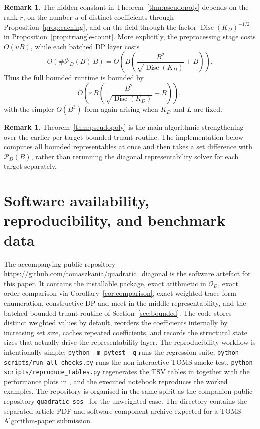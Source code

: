 \documentclass[manuscript]{acmart}
\theoremstyle{plain}
\theoremstyle{definition}
\theoremstyle{nonitalicremark}
\newtheorem{remark}[theorem]{Remark}
\newcommand{\OO}{\mathcal{O}}
\newcommand{\OD}{\OO_D}
\newcommand{\Disc}{\operatorname{Disc}}
\newcommand{\cP}{\mathcal{P}}
\begin{document}
\begin{remark}
The hidden constant in Theorem~\ref{thm:pseudopoly} depends on the rank $r$, on the number $u$ of
distinct coefficients through Proposition~\ref{prop:caching}, and on the field through the factor
$\Disc(K_D)^{-1/2}$ in Proposition~\ref{prop:triangle-count}. More explicitly, the preprocessing
stage costs $O(uB)$, while each batched DP layer costs
\[
O\!\left(\#\cP_D(B)\,B\right)
=
O\!\left(B\left(\frac{B^2}{\sqrt{\Disc(K_D)}}+B\right)\right).
\]
Thus the full bounded runtime is bounded by
\[
O\!\left(r\,B\left(\frac{B^2}{\sqrt{\Disc(K_D)}}+B\right)\right),
\]
with the simpler $O(B^3)$ form again arising when $K_D$ and $L$ are fixed.
\end{remark}

\begin{remark}
Theorem~\ref{thm:pseudopoly} is the main algorithmic strengthening over the earlier per-target
bounded-truant routine. The implementation below computes all bounded representables at once and then
takes a set difference with $\cP_D(B)$, rather than rerunning the diagonal representability solver
for each target separately.
\end{remark}

\section{Software availability, reproducibility, and benchmark data}\label{sec:impl}

The accompanying public repository \url{https://github.com/tomaszkania/quadratic_diagonal} is the
software artefact for this paper. It contains the installable package, exact arithmetic in $\OD$,
exact order comparison via Corollary~\ref{cor:comparison}, exact weighted trace-form enumeration,
constructive DP and meet-in-the-middle representability, and the batched bounded-truant routine of
Section~\ref{sec:bounded}. The code stores distinct weighted values by default, reorders the
coefficients internally by increasing set size, caches repeated coefficients, and records the
structural state sizes that actually drive the representability layer. The reproducibility workflow
is intentionally simple: \texttt{python -m pytest -q} runs the regression suite,
\texttt{python scripts/run\_all\_checks.py} runs the non-interactive TOMS smoke test,
\texttt{python scripts/reproduce\_tables.py} regenerates the TSV tables in  together
with the performance plots in , and the executed notebook reproduces the
worked examples. The repository is organised in the same spirit as the companion public repository
\texttt{quadratic\_sos}~\cite{KaniaQSOS} for the unweighted case. The 
directory contains the separated article PDF and software-component archive expected for a TOMS
Algorithm-paper submission.
\end{document}
